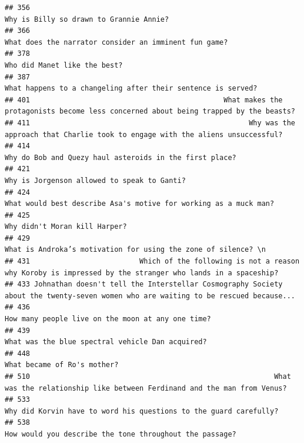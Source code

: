 \documentclass[
]{article}
\begin{document}
\begin{verbatim}
## 356                                                                                          Why is Billy so drawn to Grannie Annie? 
## 366                                                                             What does the narrator consider an imminent fun game?
## 378                                                                                                      Who did Manet like the best?
## 387                                                                      What happens to a changeling after their sentence is served?
## 401                                              What makes the protagonists become less concerned about being trapped by the beasts?
## 411                                                    Why was the approach that Charlie took to engage with the aliens unsuccessful?
## 414                                                                           Why do Bob and Quezy haul asteroids in the first place?
## 421                                                                                       Why is Jorgenson allowed to speak to Ganti?
## 424                                                                  What would best describe Asa's motive for working as a muck man?
## 425                                                                                                     Why didn't Moran kill Harper?
## 429                                                                    What is Androka’s motivation for using the zone of silence? \n
## 431                          Which of the following is not a reason why Koroby is impressed by the stranger who lands in a spaceship?
## 433 Johnathan doesn't tell the Interstellar Cosmography Society about the twenty-seven women who are waiting to be rescued because...
## 436                                                                                 How many people live on the moon at any one time?
## 439                                                                                  What was the blue spectral vehicle Dan acquired?
## 448                                                                                                       What became of Ro's mother?
## 510                                                          What was the relationship like between Ferdinand and the man from Venus?
## 533                                                                 Why did Korvin have to word his questions to the guard carefully?
## 538                                                                           How would you describe the tone throughout the passage?

\end{verbatim}
\end{document}
